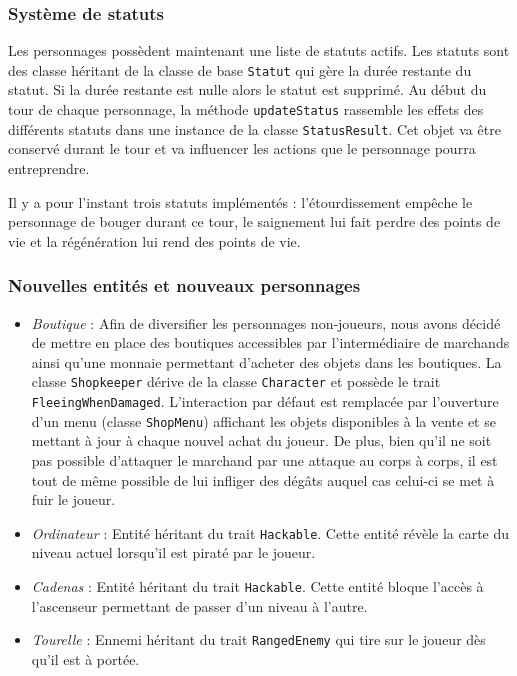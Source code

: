 \documentclass[10pt,a4paper]{article}
\begin{document}
\subsubsection{Système de statuts}
Les personnages possèdent maintenant une liste de statuts actifs. Les statuts sont des classe héritant de la classe de base \texttt{Statut} qui gère la durée restante du statut. Si la durée restante est nulle alors le statut est supprimé. Au début du tour de chaque personnage, la méthode \texttt{updateStatus} rassemble les effets des différents statuts dans une instance de la classe \texttt{StatusResult}. Cet objet va être conservé durant le tour et va influencer les actions que le personnage pourra entreprendre.

Il y a pour l'instant trois statuts implémentés : l'étourdissement empêche le personnage de bouger durant ce tour, le saignement lui fait perdre des points de vie et la régénération lui rend des points de vie.

\subsubsection{Nouvelles entités et nouveaux personnages}
\begin{itemize}
    \item \emph{Boutique} : Afin de diversifier les personnages non-joueurs, nous avons décidé de mettre en place des boutiques accessibles par l'intermédiaire de marchands ainsi qu'une monnaie permettant d'acheter des objets dans les boutiques. La classe \texttt{Shopkeeper} dérive de la classe \texttt{Character} et possède le trait \texttt{FleeingWhenDamaged}. L'interaction par défaut est remplacée par l'ouverture d'un menu (classe \texttt{ShopMenu}) affichant les objets disponibles à la vente et se mettant à jour à chaque nouvel achat du joueur. De plus, bien qu'il ne soit pas possible d'attaquer le marchand par une attaque au corps à corps, il est tout de même possible de lui infliger des dégâts auquel cas celui-ci se met à fuir le joueur.
    \item \emph{Ordinateur} : Entité héritant du trait \texttt{Hackable}. Cette entité révèle la carte du niveau actuel lorsqu'il est piraté par le joueur.
    \item \emph{Cadenas} : Entité héritant du trait \texttt{Hackable}. Cette entité bloque l'accès à l'ascenseur permettant de passer d'un niveau à l'autre.
    \item \emph{Tourelle} : Ennemi héritant du trait \texttt{RangedEnemy} qui tire sur le joueur dès qu'il est à portée.
\end{itemize}
\end{document}
